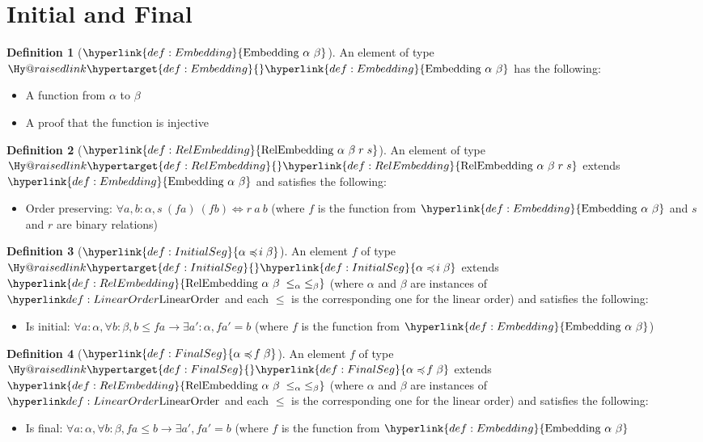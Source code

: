\documentclass{article}
\makeatletter
\newcommand\newlink[2]{{\protect\hyperlink{#1}{\normalcolor #2}}}
\newcommand\newtarget[2]{\Hy@raisedlink{\hypertarget{#1}{}}#2}
\theoremstyle{definition}
\newtheorem{definition}{Definition}
\makeatother
\begin{document}
\section*{Initial and Final}
\newcommand\Embedding[2]{\newlink{def:Embedding}{\text{Embedding } #1 \text{ } #2}}
\begin{definition}[$\Embedding{\alpha}{\beta}$]
An element of type $\newtarget{def:Embedding}{\Embedding{\alpha}{\beta}}$ has the following:
\begin{itemize}
\item A function from $\alpha$ to $\beta$
\item A proof that the function is injective
\end{itemize}
\end{definition}

\newcommand\RelEmbedding[4]{\newlink{def:RelEmbedding}{\text{RelEmbedding } #1 \text{ } #2 \; #3 \; #4}}
\begin{definition}[$\RelEmbedding{\alpha}{\beta}{r}{s}$]
An element of type $\newtarget{def:RelEmbedding}{\RelEmbedding{\alpha}{\beta}{r}{s}}$ extends $\Embedding{\alpha}{\beta}$ and satisfies the following:
\begin{itemize}
\item Order preserving: $\forall a,b : \alpha, s \  (f a) \ (f b) \iff r\  a\  b$
(where $f$ is the function from $\Embedding{\alpha}{\beta}$ and $s$ and $r$ are binary relations)
\end{itemize}
\end{definition}

\newcommand\InitialSeg[2]{\newlink{def:InitialSeg}{#1 \preccurlyeq\! i\; #2}}
\begin{definition}[$\InitialSeg{\alpha}{\beta}$]
An element $f$ of type $\newtarget{def:InitialSeg}{\InitialSeg{\alpha}{\beta}}$ extends $\RelEmbedding{\alpha}{\beta}{\le_\alpha}{\le_\beta}$ (where $\alpha$ and $\beta$ are instances of $\LinearOrder$ and each $\le$ is the corresponding one for the linear order) and satisfies the following:
\begin{itemize}
\item Is initial: $\forall a : \alpha,\forall b : \beta, b \le fa \to \exists a' : \alpha, fa' = b$ (where $f$ is the function from $\Embedding{\alpha}{\beta}$)
\end{itemize}
\end{definition}

\newcommand\FinalSeg[2]{\newlink{def:FinalSeg}{#1 \preccurlyeq\! f\; #2}}
\begin{definition}[$\FinalSeg{\alpha}{\beta}$]
An element $f$ of type $\newtarget{def:FinalSeg}{\FinalSeg{\alpha}{\beta}}$ extends $\RelEmbedding{\alpha}{\beta}{\le_\alpha}{\le_\beta}$ (where $\alpha$ and $\beta$ are instances of $\LinearOrder$ and each $\le$ is the corresponding one for the linear order) and satisfies the following:
\begin{itemize}
\item Is final: $\forall a : \alpha, \forall b : \beta, fa \le b \to \exists a', fa' = b$ (where $f$ is the function from $\Embedding{\alpha}{\beta}$
\end{itemize}
\end{definition}
\end{document}
